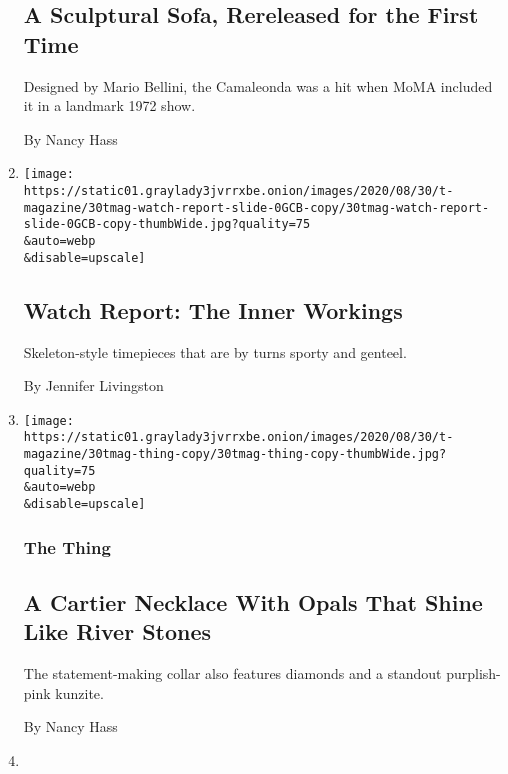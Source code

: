 \begin{enumerate}
{  \subsection{A Sculptural Sofa, Rereleased for the First
  Time}\label{a-sculptural-sofa-rereleased-for-the-first-time}}

  Designed by Mario Bellini, the Camaleonda was a hit when MoMA included
  it in a landmark 1972 show.

  By Nancy Hass
\item
  \href{/2020/08/27/t-magazine/skeleton-watches.html}{}

  \texttt{[image: https://static01.graylady3jvrrxbe.onion/images/2020/08/30/t-magazine/30tmag-watch-report-slide-0GCB-copy/30tmag-watch-report-slide-0GCB-copy-thumbWide.jpg?quality=75\\\&auto=webp\\\&disable=upscale]}

  \hypertarget{watch-report-the-inner-workings}{%
  \subsection{Watch Report: The Inner
  Workings}\label{watch-report-the-inner-workings}}

  Skeleton-style timepieces that are by turns sporty and genteel.

  By Jennifer Livingston
\item
  \href{/2020/08/26/t-magazine/cartier-necklace-surnaturel.html}{}

  \texttt{[image: https://static01.graylady3jvrrxbe.onion/images/2020/08/30/t-magazine/30tmag-thing-copy/30tmag-thing-copy-thumbWide.jpg?quality=75\\\&auto=webp\\\&disable=upscale]}

  \hypertarget{the-thing}{%
  \subsubsection{The Thing}\label{the-thing}}

  \hypertarget{a-cartier-necklace-with-opals-that-shine-like-river-stones}{%
  \subsection{A Cartier Necklace With Opals That Shine Like River
  Stones}\label{a-cartier-necklace-with-opals-that-shine-like-river-stones}}

  The statement-making collar also features diamonds and a standout
  purplish-pink kunzite.

  By Nancy Hass
\item
  \href{/2020/08/25/t-magazine/fall-bags-pillowy-clutches-accessories.html}{}


\end{enumerate}
